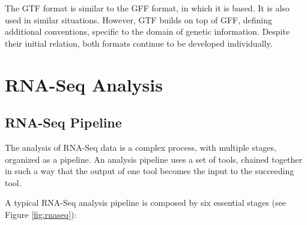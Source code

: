 The GTF format is similar to the GFF format, in which it is based. It is also
used in similar situations. However, GTF builds on top of GFF, defining
additional conventions, specific to the domain of genetic information. Despite
their initial relation, both formats continue to be developed individually.

\section{RNA-Seq Analysis}


\subsection{RNA-Seq Pipeline}

The analysis of RNA-Seq data is a complex process, with multiple stages,
organized as a pipeline. An analysis pipeline uses a set of tools, chained
together in such a way that the output of one tool becomes the input to the
succeeding tool.

A typical RNA-Seq analysis pipeline is composed by six essential stages
\cite{rnaseqpipeline} (see Figure \ref{fig:rnaseq}):

